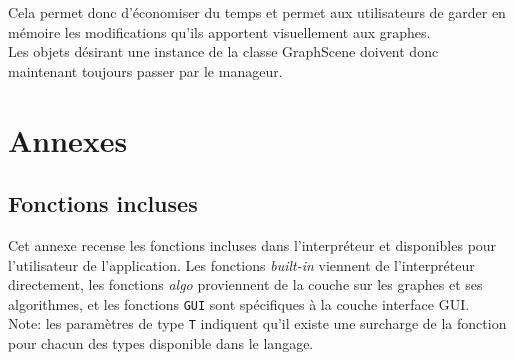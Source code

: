\documentclass[french]{article}
\begin{document}
			Cela permet donc d'économiser du temps et permet aux utilisateurs de garder en mémoire les modifications qu'ils apportent visuellement aux graphes. \\
			
			Les objets désirant une instance de la classe GraphScene doivent donc maintenant toujours passer par le manageur.
	
	\section{Annexes}
	
		\subsection{Fonctions incluses}
			\label{subsec:annexes-fonctions-incluses}
			Cet annexe recense les fonctions incluses dans l'interpréteur et disponibles pour l'utilisateur de l'application. Les fonctions \textit{built-in} viennent de l'interpréteur directement, les fonctions \textit{algo} proviennent de la couche sur les graphes et ses algorithmes, et les fonctions \texttt{GUI} sont spécifiques à la couche interface GUI.\\
			
			Note: les paramètres de type \texttt{T} indiquent qu'il existe une surcharge de la fonction pour chacun des types disponible dans le langage.
			
\end{document}
